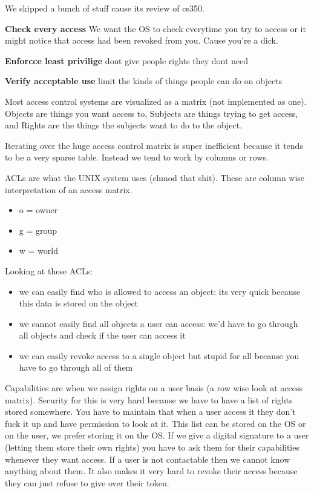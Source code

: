 \documentclass{article}
\begin{document}
We skipped a bunch of stuff cause its review of cs350. 



\textbf{Check every access} We want the OS to check everytime you try to access or it might notice that access had been revoked from you. Cause you're a dick.

\textbf{Enforcce least privilige} dont give people rights they dont need

\textbf{Verify acceptable use} limit the kinds of things people can do on objects


Most access control systems are visualized as a matrix (not implemented as one). Objects are things you want access to, Subjects are things trying to get access, and Rights are the things the subjects want to do to the object. 


Iterating over the huge access control matrix is super inefficient because it tends to be a very sparse table. Instead we tend to work by columns or rows.


ACLs are what the UNIX system uses (chmod that shit). These are column wise interpretation of an access matrix.

\begin{itemize}
	\item o = owner
	\item g = group
	\item w = world
\end{itemize}

Looking at these ACLs:
\begin{itemize}
	\item we can easily find who is allowed to access an object: its very quick because this data is stored on the object
	\item we cannot easily find all objects a user can access: we'd have to go through all objects and check if the user can access it
	\item we can easily revoke access to a single object but stupid for all because you have to go through all of them
\end{itemize}


Capabilities are when we assign rights on a user basis (a row wise look at access matrix). Security for this is very hard because we have to have a list of rights stored somewhere. You have to maintain that when a user access it they don't fuck it up and have permission to look at it. This list can be stored on the OS or on the user, we prefer storing it on the OS. If we give a digital signature to a user (letting them store their own rights) you have to ask them for their capabilities whenever they want access. If a user is not contactable then we cannot know anything about them. It also makes it very hard to revoke their access because they can just refuse to give over their token.
 
\end{document}

